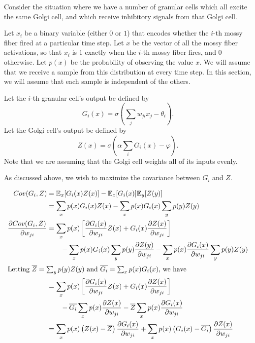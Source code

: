 \documentclass{article}
\theoremstyle{definition}
\begin{document}
Consider the situation where we have a number of granular cells which
all excite the same Golgi cell, and which receive inhibitory signals
from that Golgi cell.

Let $x_i$ be a binary variable (either $0$ or $1$) that encodes
whether the $i$-th mossy fiber fired at a particular time step. Let
$x$ be the vector of all the mossy fiber activations, so that $x_i$ is
$1$ exactly when the $i$-th mossy fiber fires, and $0$ otherwise. Let
$p(x)$ be the probability of observing the value $x$. We will assume
that we receive a sample from this distribution at every time step.
In this section, we will assume that each sample is independent of the
others.

Let the $i$-th granular cell's output be defined by
$$G_i(x) = \sigma\left( \sum_j w_{ji} x_j - \theta_i \right).$$
Let the Golgi cell's output be defined by
$$Z(x) = \sigma \left( \alpha \sum_i G_i(x) - \varphi \right).$$
Note that we are assuming that the Golgi cell weights all of its inputs evenly.

As discussed above, we wish to maximize the covariance between $G_i$
and $Z$.  

\begin{align*}
Cov(G_i, Z) &= \mathbb{E}_x [ G_i(x) Z(x) ] - \mathbb{E}_x [ G_i(x) ] \mathbb{E}_y [ Z(y) ] \\
&= \sum_x p(x) G_i(x) Z(x) - \sum_x p(x) G_i(x) \sum_y p(y) Z(y) \\
\frac{\partial Cov(G_i, Z)}{\partial w_{ji}} &= \sum_x p(x) \left[\frac{\partial G_i(x)}{\partial w_{ji}} Z(x) + G_i(x) \frac{\partial Z(x)}{\partial w_{ji}}\right] \\
&\qquad - \sum_x p(x) G_i(x) \sum_y p(y) \frac{\partial Z(y)}{\partial w_{ji}} - \sum_x p(x) \frac{\partial G_i(x)}{\partial w_{ji}} \sum_y p(y) Z(y) \\
\intertext{Letting $\overline{Z} = \sum_y p(y) Z(y)$ and $\overline{G_i} = \sum_x p(x) G_i(x)$, we have}
&= \sum_x p(x) \left[\frac{\partial G_i(x)}{\partial w_{ji}} Z(x) + G_i(x) \frac{\partial Z(x)}{\partial w_{ji}}\right] \\
&\qquad - \overline{G_i} \sum_x p(x) \frac{\partial Z(x)}{\partial w_{ji}} - \overline{Z} \sum_x p(x) \frac{\partial G_i(x)}{\partial w_{ji}} \\
&= \sum_x p(x) \left( Z(x) - \overline{Z}\right) \frac{\partial G_i(x)}{\partial w_{ji}} + \sum_x p(x) \left(G_i(x) - \overline{G_i}\right) \frac{\partial Z(x)}{\partial w_{ji}}
\end{align*}
\end{document}
